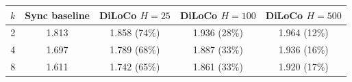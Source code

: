 \begin{tabular}{ccccc}
\toprule
$k$ & Sync baseline & DiLoCo $H{=}25$ & DiLoCo $H{=}100$ & DiLoCo $H{=}500$ \\
\midrule
2 & 1.813 & 1.858 (74\%) & 1.936 (28\%) & 1.964 (12\%) \\
4 & 1.697 & 1.789 (68\%) & 1.887 (33\%) & 1.936 (16\%) \\
8 & 1.611 & 1.742 (65\%) & 1.861 (33\%) & 1.920 (17\%) \\
\bottomrule
\end{tabular}
